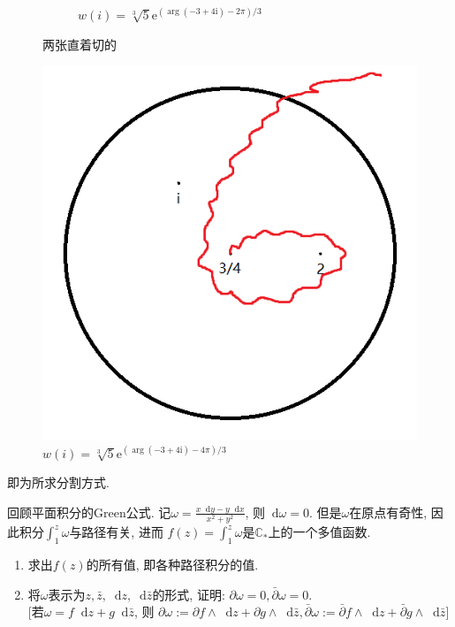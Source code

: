 \documentclass[a4paper,12pt]{ctexart}
\newcommand{\diff}{\mathop{}\!\mathrm{d}}
\newcommand{\me}{\mathrm{e}}
\newcommand{\mi}{\mathrm{i}}
\begin{document}
\begin{solution}
\begin{figure}[H]
\begin{subfigure}{.49\textwidth}
                \caption{$\displaystyle w(i)=\sqrt[3]{5}\me^{(\arg(-3+4\mi)-2\pi)/3}$}
                \label{figure_-2pi}
            \end{subfigure}
            \caption{两张直着切的}
            \label{figure_straight}
        \end{figure}
        \begin{figure}[H]
            \centering
            \includegraphics[scale=0.5]{-4pi.png}
            \caption{$\displaystyle w(i)=\sqrt[3]{5}\me^{(\arg(-3+4\mi)-4\pi)/3}$}
            \label{figure_-4pi}
        \end{figure}
        即为所求分割方式.
    \end{solution}

    \begin{problem}
        回顾平面积分的Green公式.
        记$\displaystyle\omega=\frac{x\diff y-y\diff x}{x^2+y^2}$,
        则$\diff \omega=0$.
        但是$\omega$在原点有奇性,
        因此积分$\displaystyle\int_{1}^{z}{\omega}$与路径有关, 进而
        $\displaystyle f(z)=\int_{1}^{z}{\omega}$是$\mathbb{C}_{*}$上的一个多值函数.
        \begin{enumerate}[(1)]
            \item 求出$f(z)$的所有值, 即各种路径积分的值.
            \item 将$\omega$表示为$z, \bar{z}, \diff z, \diff \bar{z}$的形式,
                证明: $\partial\omega=0, \bar{\partial}\omega=0$.\\
                {[}若$\omega=f\diff z+g\diff \bar{z}$, 则
                $\partial\omega:=\partial f\wedge\diff z
                    +\partial g\wedge\diff \bar{z},
                \bar{\partial}\omega:=\bar{\partial} f\wedge\diff z
                    +\bar{\partial} g\wedge\diff \bar{z}${]}
        \end{enumerate}
    \end{problem}
\end{document}
